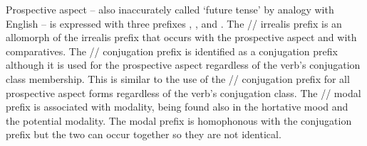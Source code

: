 \documentclass[12pt,letterpaper,landscape,oneside,article]{memoir}
\begin{document}
\begin{multicols}{2}
\noindent
Prospective aspect – also inaccurately called ‘future tense’ by analogy with English – is expressed with three prefixes , , and .
The  // irrealis prefix is an allomorph of the irrealis prefix that occurs with the prospective aspect and with comparatives.
The  // conjugation prefix is identified as a conjugation prefix although it is used for the prospective aspect regardless of the verb’s conjugation class membership.
This is similar to the use of the  // conjugation prefix for all prospective aspect forms regardless of the verb’s conjugation class.
The  // modal prefix is associated with modality, being found also in the hortative mood and the potential modality.
The  modal prefix is homophonous with the  conjugation prefix but the two can occur together so they are not identical.
\end{multicols}
\end{document}
